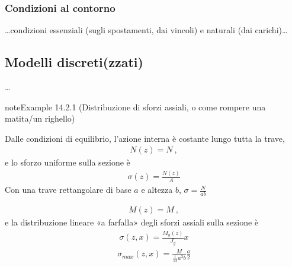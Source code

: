 \documentclass[letterpaper,10pt,italian]{jupyterBook}
\begin{document}
\subsubsection{Condizioni al contorno}
\label{\detokenize{ch/continuum/solids:condizioni-al-contorno}}\label{\detokenize{ch/continuum/solids:contiuum-solids-beam-statics-bc}}
\sphinxAtStartPar
…condizioni essenziali (sugli spostamenti, dai vincoli) e naturali (dai carichi)…


\subsection{Modelli discreti(zzati)}
\label{\detokenize{ch/continuum/solids:modelli-discreti-zzati}}
\sphinxAtStartPar
…
\label{ch/continuum/solids:solids-pencil}
\begin{sphinxadmonition}{note}{Example 14.2.1 (Distribuzione di sforzi assiali, o come rompere una matita/un righello)}



\sphinxAtStartPar
{} Dalle condizioni di equilibrio, l’azione interna è costante lungo tutta la trave,
\begin{equation*}
\begin{split}N(z) = N \ ,\end{split}
\end{equation*}
\sphinxAtStartPar
e lo sforzo uniforme sulla sezione è
\begin{equation*}
\begin{split}\sigma(z) = \frac{N(z)}{A}\end{split}
\end{equation*}
\sphinxAtStartPar
Con una trave rettangolare di base \(a\) e altezza \(b\), \(\sigma = \frac{N}{a b}\)

\sphinxAtStartPar
{}
\begin{equation*}
\begin{split}M(z) = M \ ,\end{split}
\end{equation*}
\sphinxAtStartPar
e la distribuzione lineare «a farfalla» degli sforzi assiali sulla sezione è
\begin{equation*}
\begin{split}\sigma(z,x) = \frac{M_y(z)}{J_y} x \end{split}
\end{equation*}\begin{equation*}
\begin{split}\sigma_{max}(z,x) = \frac{M}{ \frac{1}{12} a^3 b } \frac{a}{2}\end{split}
\end{equation*}


\end{sphinxadmonition}
\end{document}
